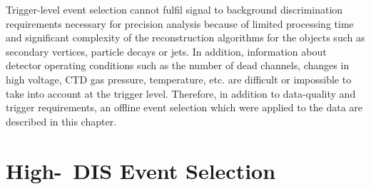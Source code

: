 Trigger-level event selection cannot fulfil signal to background discrimination requirements necessary for precision analysis because of limited processing time and significant complexity of the reconstruction algorithms for the objects such as secondary vertices, particle decays or jets. In addition, information about detector operating conditions such as the number of dead channels, changes in high voltage, CTD gas pressure, temperature, etc. are difficult or impossible to take into account at the trigger level. Therefore, in addition to data-quality and trigger requirements, an offline event selection which were applied to the data are described in this chapter. 
\section{High-\qsq\, DIS Event Selection}
\label{sec:dissel}

